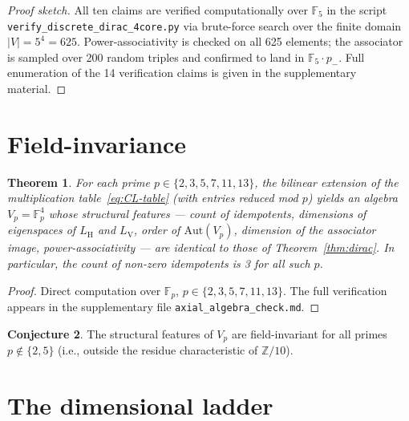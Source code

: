 \documentclass[11pt,reqno]{amsart}
\theoremstyle{plain}
\newtheorem{theorem}{Theorem}[section]
\theoremstyle{definition}
\newtheorem{conjecture}[theorem]{Conjecture}
\theoremstyle{remark}
\newcommand{\Z}{\mathbb{Z}}
\newcommand{\F}{\mathbb{F}}
\newcommand{\Aut}{\mathrm{Aut}}
\DeclareMathOperator{\HARM}{H}    %
\DeclareMathOperator{\VOID}{V}    %
\begin{document}
\begin{proof}[Proof sketch]
All ten claims are verified computationally over $\F_5$ in
the script \texttt{verify\_discrete\_dirac\_4core.py} via brute-force search
over the finite domain $|V| = 5^4 = 625$. Power-associativity is checked
on all 625 elements; the associator is sampled over 200 random triples
and confirmed to land in $\F_5 \cdot p_-$. Full enumeration of the 14
verification claims is given in the supplementary material.
\end{proof}

\section{Field-invariance}
\label{sec:fpuniv}

\begin{theorem}\label{thm:fpuniv}
For each prime $p \in \{2, 3, 5, 7, 11, 13\}$, the bilinear extension of
the multiplication table~\eqref{eq:CL-table} (with entries reduced mod $p$)
yields an algebra $V_p = \F_p^4$ whose structural features --- count of
idempotents, dimensions of eigenspaces of $L_{\HARM}$ and $L_{\VOID}$,
order of $\Aut(V_p)$, dimension of the associator image, power-associativity ---
are identical to those of Theorem~\ref{thm:dirac}. In particular, the count
of non-zero idempotents is 3 for all such $p$.
\end{theorem}

\begin{proof}
Direct computation over $\F_p$, $p \in \{2, 3, 5, 7, 11, 13\}$. The full
verification appears in the supplementary file
\texttt{axial\_algebra\_check.md}.
\end{proof}

\begin{conjecture}\label{conj:fpuniv-allp}
The structural features of $V_p$ are field-invariant for all primes
$p \notin \{2, 5\}$ (i.e., outside the residue characteristic of $\Z/10$).
\end{conjecture}

\section{The dimensional ladder}
\label{sec:clifford}
\end{document}
